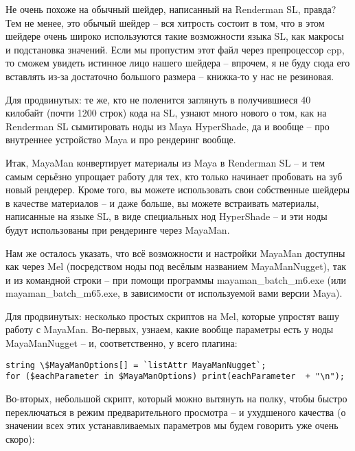  Не очень похоже на обычный шейдер, написанный на
    Renderman SL, правда? Тем не менее, это обычый шейдер – вся
    хитрость состоит в том, что в этом шейдере очень широко
    используются такие возможности языка SL, как макросы и подстановка
    значений. Если мы пропустим этот файл через препроцессор cpp, то
    сможем увидеть истинное лицо нашего шейдера – впрочем, я не буду
    сюда его вставлять из-за достаточно большого размера – книжка-то у
    нас не резиновая.
  

 Для
    продвинутых: те же, кто не
    поленится заглянуть в получившиеся 40 килобайт (почти 1200 строк)
    кода на SL, узнают много нового о том, как на Renderman SL
    сымитировать ноды из Maya HyperShade, да и вообще – про внутреннее
    устройство Maya и про рендеринг вообще.
  

 Итак, MayaMan конвертирует материалы из Maya в
    Renderman SL – и тем самым серьёзно упрощает работу для тех, кто
    только начинает пробовать на зуб новый рендерер. Кроме того, вы
    можете использовать свои собственные шейдеры в качестве материалов
    – и даже больше, вы можете встраивать материалы, написанные на
    языке SL, в виде специальных нод HyperShade – и эти ноды будут
    использованы при рендеринге через MayaMan.
  

 Нам же осталось указать, что всё возможности и
    настройки MayaMan доступны как через Mel (посредством ноды под
    весёлым названием MayaManNugget), так и из командной строки – при
    помощи программы mayaman\_batch\_m6.exe (или mayaman\_batch\_m65.exe, в
    зависимости от используемой вами версии Maya).
  

 Для
    продвинутых: несколько простых
    скриптов на Mel, которые упростят вашу работу с MayaMan. Во-первых,
    узнаем, какие вообще параметры есть у ноды MayaManNugget – и,
    соответственно, у всего плагина:
  
\begin{lstlisting}[frame=single, framerule=0pt, framesep=10pt, xleftmargin=10pt, xrightmargin=10pt]
string \$MayaManOptions[] = `listAttr MayaManNugget`;
for ($eachParameter in $MayaManOptions) print(eachParameter  + "\n");
\end{lstlisting}  

 Во-вторых,
    небольшой скрипт, который можно вытянуть на полку, чтобы быстро
    переключаться в режим предварительного просмотра – и ухудшеного
    качества (о значении всех этих устанавливаемых параметров мы будем
    говорить уже очень скоро):
  

